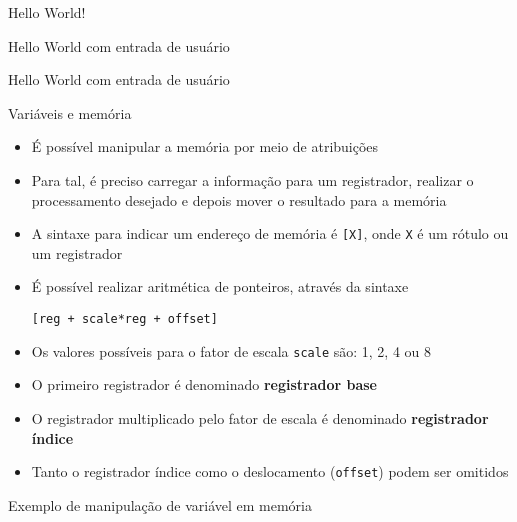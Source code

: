 \begin{frame}[fragile]{Hello World!}
\end{frame}

\begin{frame}[fragile]{Hello World com entrada de usuário}
\end{frame}

\begin{frame}[fragile]{Hello World com entrada de usuário}
\end{frame}

\begin{frame}[fragile]{Variáveis e memória}

    \begin{itemize}
        \item É possível manipular a memória por meio de atribuições

        \item Para tal, é preciso carregar a informação para um registrador, realizar o
            processamento desejado e depois mover o resultado para a memória

        \item A sintaxe para indicar um endereço de memória é \texttt{[X]}, onde 
            \texttt{X} é um rótulo ou um registrador

        \item É possível realizar aritmética de ponteiros, através da sintaxe
        \begin{center}
            \texttt{[reg + scale*reg + offset]}
        \end{center}

        \item Os valores possíveis para o fator de escala \texttt{scale} são: 1, 2, 4 ou 8

        \item O primeiro registrador é denominado \textbf{registrador base}

        \item O registrador multiplicado pelo fator de escala é denominado \textbf{registrador 
            índice}

        \item Tanto o registrador índice como o deslocamento (\texttt{offset}) podem ser omitidos
    \end{itemize}

\end{frame}

\begin{frame}[fragile]{Exemplo de manipulação de variável em memória}
\end{frame}
